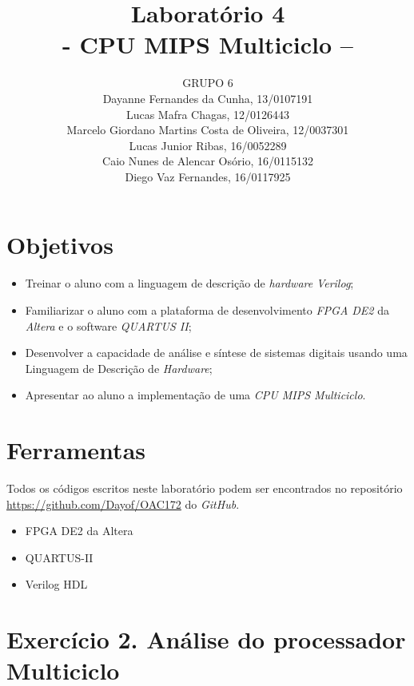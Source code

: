 \documentclass[12pt]{article}
\title{Laboratório 4\\- CPU MIPS Multiciclo –}
\author{GRUPO 6\\
	Dayanne Fernandes da Cunha, 13/0107191\\
	Lucas Mafra Chagas, 12/0126443\\
	Marcelo Giordano Martins Costa de Oliveira, 12/0037301\\
	Lucas Junior Ribas, 16/0052289\\
	Caio Nunes de Alencar Osório, 16/0115132\\
	Diego Vaz Fernandes, 16/0117925}
\begin{document}
\maketitle

\section{Objetivos}
\label{sec:Objetivos}

\begin{itemize}
\item Treinar o aluno com a linguagem de descrição de \textit{hardware} \textit{Verilog};
\item Familiarizar o aluno com a plataforma de desenvolvimento \textit{FPGA DE2} da \textit{Altera} e o software \textit{QUARTUS II};
\item Desenvolver a capacidade de análise e síntese de sistemas digitais usando uma Linguagem de Descrição de \textit{Hardware};
\item Apresentar ao aluno a implementação de uma \textit{CPU MIPS Multiciclo}.
\end{itemize}

\section{Ferramentas}
\label{sec:Materiais}

Todos os códigos escritos neste laboratório podem ser encontrados no repositório \url{https://github.com/Dayof/OAC172} do \textit{GitHub}.

\begin{itemize}
\item FPGA DE2 da Altera 
\item QUARTUS-II
\item Verilog HDL
\end{itemize}

\section{Exercício 2. Análise do processador Multiciclo}
\label{sec:multiciclo}
\end{document}
